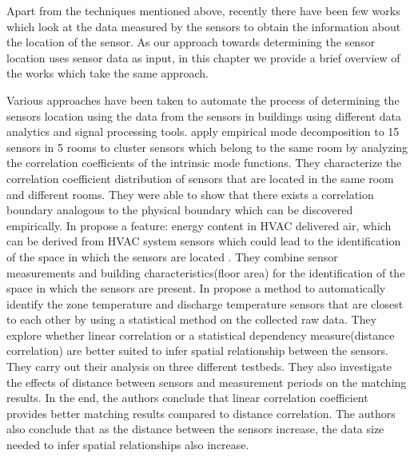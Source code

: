 Apart from the techniques mentioned above, recently there have been few works which look at the data measured by the sensors to obtain the information about the location of the sensor. As our approach towards determining the sensor location uses sensor data as input, in this chapter we provide a brief overview of the works which take the same approach. 

Various approaches have been taken to automate the process of determining the sensors location using the data from the sensors in buildings using different data analytics and signal processing tools. \citeauthor{Hong:2013:TAS:2528282.2528302}\cite{Hong:2013:TAS:2528282.2528302}
 apply empirical mode decomposition to 15 sensors in 5 rooms to cluster sensors which belong to the same room by analyzing the correlation coefficients of the intrinsic mode functions. They characterize the correlation coefficient distribution of sensors that are located in the
 same room and different rooms. They were able to show that there exists a correlation boundary analogous to the physical boundary which can be discovered empirically. 
In \cite{doi:10.1061/9780784413616.226} \citeauthor{doi:10.1061/9780784413616.226} propose a feature: energy content in HVAC delivered air, which can be derived from HVAC system sensors which could lead to the identification of the space in which the sensors are located . They combine sensor measurements and building characteristics(floor area) for the identification of the space in which the sensors are present.
In \cite{Koc:2014:CLC:2674061.2674075} \citeauthor{Koc:2014:CLC:2674061.2674075} propose a method to automatically identify the zone temperature and discharge temperature sensors that are closest to each other by using a statistical method on the collected raw data. They explore whether linear correlation or a statistical dependency measure(distance correlation) are better suited to infer spatial relationship between the sensors. They carry out their analysis on three different testbeds. They also investigate the effects of distance between sensors and measurement periods on the matching results. In the end, the authors conclude that linear correlation coefficient provides better matching results compared to distance correlation. The authors also conclude that as the distance between the sensors increase, the data size needed to infer spatial relationships also increase.

